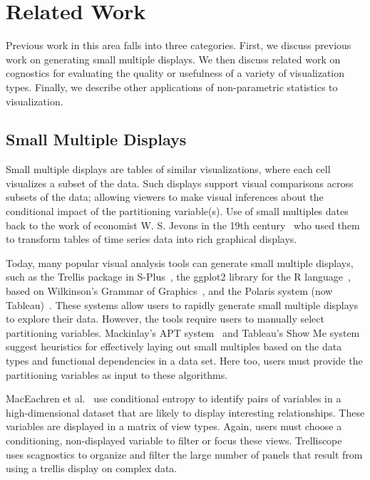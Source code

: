 \section{Related Work}
\label{sec:related}
Previous work in this area falls into three categories. First, we discuss previous work on generating small multiple displays. We then discuss related work on cognostics for evaluating the quality or usefulness of a variety of visualization types. Finally, we describe other applications of non-parametric statistics to visualization.

\subsection{Small Multiple Displays}
Small multiple displays are tables of similar visualizations, where each cell visualizes a subset of the data. Such displays support visual comparisons across subsets of the data; allowing viewers to make visual inferences about the conditional impact of the partitioning variable(s). Use of small multiples dates back to the work of economist W. S. Jevons in the 19th century~\cite{Kelley1973} who used them to transform tables of time series data into rich graphical displays. 

Today, many popular visual analysis tools can generate small multiple displays, such as the Trellis package in S-Plus~\cite{Becker1996-manual}, the ggplot2 library for the R language~\cite{Wickham2006}, based on Wilkinson's Grammar of Graphics~\cite{Wilkinson2005}, and the Polaris system (now Tableau)~\cite{Stolte2002}. These systems allow users to rapidly generate small multiple displays to explore their data. However, the tools require users to manually select partitioning variables. Mackinlay's APT system~\cite{mackinlay1986} and Tableau's Show Me system~\cite{mackinlay2007} suggest heuristics for effectively laying out small multiples based on the data types and functional dependencies in a data set. Here too, users must provide the partitioning variables as input to these algorithms. 

MacEachren et al.~\cite{Maceachren2003} use conditional entropy to identify pairs of variables in a high-dimensional dataset that are likely to display interesting relationships. These variables are displayed in a matrix of view types. Again, users must choose a conditioning, non-displayed variable to filter or focus these views. Trelliscope~\cite{Hafen2013} uses scagnostics to organize and filter the large number of panels that result from using a trellis display on complex data.

